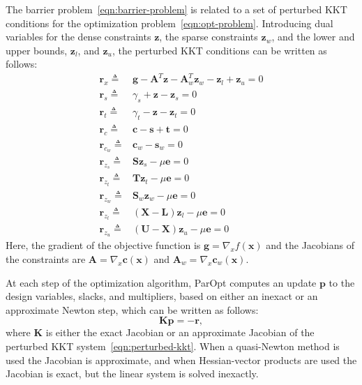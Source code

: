 \documentclass[12pt]{article}
\newcommand{\mb}{\mathbf}
\begin{document}
The barrier problem~\eqref{eqn:barrier-problem} is related to a set of perturbed KKT conditions for the optimization problem~\eqref{eqn:opt-problem}.
Introducing dual variables for the dense constraints $\mb{z}$, the sparse constraints $\mb{z}_{w}$, and the lower and upper bounds, $\mb{z}_{l}$, and $\mb{z}_{u}$, the perturbed KKT conditions can be written as follows:
%
\begin{equation}
  \label{eqn:perturbed-kkt}
  \begin{aligned}
    \mb{r}_{x} \triangleq     & \mb{g} - \mb{A}^{T}\mb{z} - \mb{A}^{T}_{w} \mb{z}_{w} - \mb{z}_{l} + \mb{z}_{u} = 0 \\
    \mb{r}_{s} \triangleq     & \gamma_{s} + \mb{z} - \mb{z}_{s} = 0 \\
    \mb{r}_{t} \triangleq     & \gamma_{t} - \mb{z} - \mb{z}_{t} = 0 \\
    \mb{r}_{c} \triangleq     & \mb{c} - \mb{s} + \mb{t} = 0 \\
    \mb{r}_{c_{w}} \triangleq & \mb{c}_{w} - \mb{s}_{w} = 0 \\
    \mb{r}_{z_{s}} \triangleq & \mb{S} \mb{z}_{s} - \mu \mb{e} = 0 \\
    \mb{r}_{z_{t}} \triangleq & \mb{T}\mb{z}_{t} - \mu \mb{e} = 0 \\
    \mb{r}_{z_{w}} \triangleq & \mb{S}_{w} \mb{z}_{w} - \mu \mb{e} = 0 \\
    \mb{r}_{z_{l}} \triangleq & (\mb{X} - \mb{L})\mb{z}_{l} - \mu \mb{e} = 0 \\
    \mb{r}_{z_{u}} \triangleq & (\mb{U} - \mb{X})\mb{z}_{u} - \mu \mb{e} = 0
  \end{aligned}
\end{equation}
Here, the gradient of the objective function is $\mb{g} = \nabla_{x} f(\mb{x})$ and the Jacobians of the constraints are $\mb{A} = \nabla_{x} \mb{c}(\mb{x})$ and $\mb{A}_{w} = \nabla_{x} \mb{c}_{w}(\mb{x})$.

At each step of the optimization algorithm, ParOpt computes an update $\mb{p}$ to the design variables, slacks, and multipliers, based on either an inexact or an approximate Newton step, which can be written as follows:
%
\begin{equation*}
  \mb{K} \mb{p} = - \mb{r},
\end{equation*}
where $\mb{K}$ is either the exact Jacobian or an approximate Jacobian of the perturbed KKT system~\eqref{eqn:perturbed-kkt}.
When a quasi-Newton method is used the Jacobian is approximate, and when Hessian-vector products are used the Jacobian is exact, but the linear system is solved inexactly.
\end{document}
